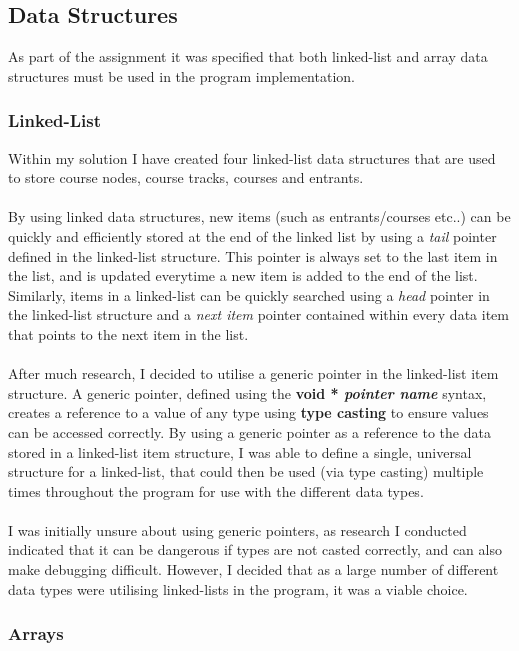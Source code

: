 \documentclass[12pt]{article}
\begin{document}
\subsection{Data Structures}

As part of the assignment it was specified that both linked-list and array data structures must be used in the program implementation.

\subsubsection{Linked-List}

Within my solution I have created four linked-list data structures that are used to store course nodes, course tracks, courses and entrants. \\\\
By using linked data structures, new items (such as entrants/courses etc..) can be quickly and efficiently stored at the end of the linked list by using a \textit{tail} pointer defined in the linked-list structure. This pointer is always set to the last item in the list, and is updated everytime a new item is added to the end of the list. Similarly, items in a linked-list can be quickly searched using a \textit{head} pointer in the linked-list structure and a \textit{next item} pointer contained within every data item that points to the next item in the list. \\\\
After much research, I decided to utilise a generic pointer in the linked-list item structure. A generic pointer, defined using the \textbf{void * \textit{pointer name}} syntax, creates a reference to a value of any type using \textbf{type casting} to ensure values can be accessed correctly. By using a generic pointer as a reference to the data stored in a linked-list item structure, I was able to define a single, universal structure for a linked-list, that could then be used (via type casting) multiple times throughout the program for use with the different data types. \\\\
I was initially unsure about using generic pointers, as research I conducted indicated that it can be dangerous if types are not casted correctly, and can also make debugging difficult. However, I decided that as a large number of different data types were utilising linked-lists in the program, it was a viable choice.

\subsubsection{Arrays}
\end{document}
